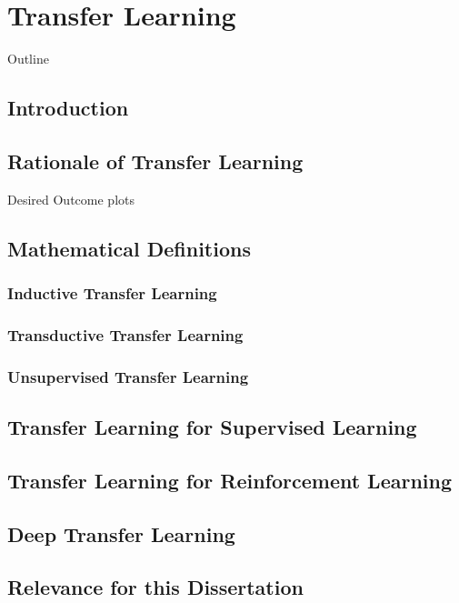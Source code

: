 \chapter{Transfer Learning}
\label{ch:transfer_learnimg}


\begin{remark}{Outline}
\end{remark}

\section{Introduction}

\section{Rationale of Transfer Learning}
Desired Outcome plots


\section{Mathematical Definitions}
\subsection{Inductive Transfer Learning}
\subsection{Transductive Transfer Learning}
\subsection{Unsupervised Transfer Learning}

\section{Transfer Learning for Supervised Learning}
\section{Transfer Learning for Reinforcement Learning}
\section{Deep Transfer Learning}

\section{Relevance for this Dissertation}
